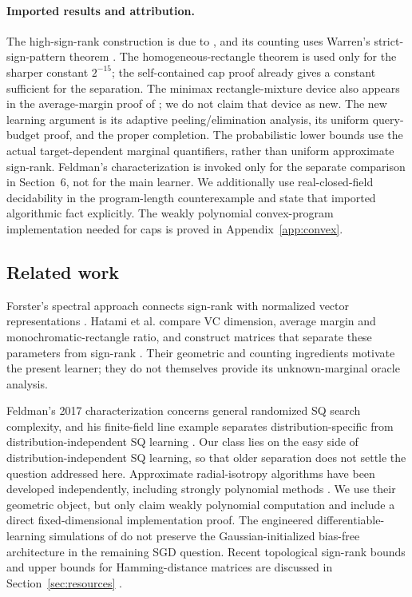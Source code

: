 \paragraph{Imported results and attribution.}
The high-sign-rank construction is due to \citet{HHPTZ22}, and its counting uses Warren's strict-sign-pattern theorem \citep{Warren68,AMY16}. The homogeneous-rectangle theorem \citep{APP05} is used only for the sharper constant $2^{-15}$; the self-contained cap proof already gives a constant sufficient for the separation. The minimax rectangle-mixture device also appears in the average-margin proof of \citet[Theorem~3.1]{HHPTZ22}; we do not claim that device as new. The new learning argument is its adaptive peeling/elimination analysis, its uniform query-budget proof, and the proper completion. The probabilistic lower bounds use the actual target-dependent marginal quantifiers, rather than uniform approximate sign-rank. Feldman's characterization is invoked only for the separate comparison in Section~6, not for the main learner. We additionally use real-closed-field decidability in the program-length counterexample and state that imported algorithmic fact explicitly. The weakly polynomial convex-program implementation needed for caps is proved in Appendix~\ref{app:convex}.

\subsection{Related work}
Forster's spectral approach connects sign-rank with normalized vector representations \citep{Forster02}. Hatami et al. compare VC dimension, average margin and monochromatic-rectangle ratio, and construct matrices that separate these parameters from sign-rank \citep{HHPTZ22}. Their geometric and counting ingredients motivate the present learner; they do not themselves provide its unknown-marginal oracle analysis.

Feldman's 2017 characterization concerns general randomized SQ search complexity, and his finite-field line example separates distribution-specific from distribution-independent SQ learning \citep{Feldman17}. Our class lies on the easy side of distribution-independent SQ learning, so that older separation does not settle the question addressed here. Approximate radial-isotropy algorithms have been developed independently, including strongly polynomial methods \citep{DKT22}. We use their geometric object, but only claim weakly polynomial computation and include a direct fixed-dimensional implementation proof. The engineered differentiable-learning simulations of \citet{AKMSS21} do not preserve the Gaussian-initialized bias-free architecture in the remaining SGD question. Recent topological sign-rank bounds and upper bounds for Hamming-distance matrices are discussed in Section~\ref{sec:resources} \citep{FHV26,GHIS25}.
